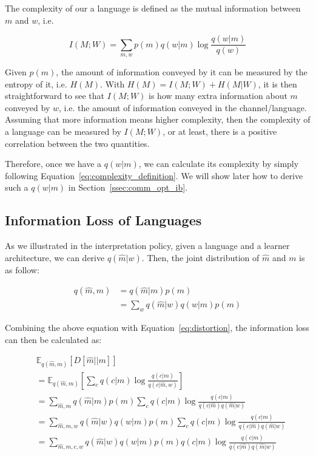 \documentclass[11pt]{article}
\begin{document}
The complexity of our a language is defined as the mutual information between $m$ and $w$, i.e. 

\begin{equation}
    I(M;W) = \sum_{m,w} p(m)q(w|m)\log \frac{q(w|m)}{q(w)}
    \label{eq:complexity_definition}
\end{equation}

Given $p(m)$, the amount of information conveyed by it can be measured by the entropy of it, i.e. $H(M)$.
With $H(M)=I(M;W)+H(M|W)$, it is then straightforward to see that $I(M;W)$ is how many extra information about $m$ conveyed by $w$, i.e. the amount of information conveyed in the channel/language.
Assuming that more information means higher complexity, then the complexity of a language can be measured by $I(M;W)$, or at least, there is a positive correlation between the two quantities.

Therefore, once we have a $q(w|m)$, we can calculate its complexity by simply following Equation~\ref{eq:complexity_definition}.
We will show later how to derive such a $q(w|m)$ in Section~\ref{ssec:comm_opt_ib}.

\subsection{Information Loss of Languages}
\label{ssec:lan_info_loss}

As we illustrated in the interpretation policy, given a language and a learner architecture, we can derive $q(\hat{m}|w)$.
Then, the joint distribution of $\hat{m}$ and $m$ is as follow:

\begin{equation}
    \begin{split}
        q(\hat{m},m) 
        & = q(\hat{m}|m)p(m) \\
        & = \sum_w q(\hat{m}|w)q(w|m)p(m)
    \end{split}
    \label{eq:joint_c_hat_c}
\end{equation}

Combining the above equation with Equation~\ref{eq:distortion}, the information loss can then be calculated as:

\begin{equation}
    \begin{split}
        & \mathbb{E}_{q(\hat{m},m)}\left[D[\hat{m}||m]\right] \\
        & = \mathbb{E}_{q(\hat{m},m)}\left[ \sum_{c} q(c|m) \log \frac{q(c|m)}{q(c|\hat{m}, w)} \right] \\
        & = \sum_{\hat{m},m} q(\hat{m}|m)p(m)\sum_{c} q(c|m)\log\frac{q(c|m)}{q(c|\hat{m})q(\hat{m}|w)} \\
        & = \sum_{\hat{m},m,w} q(\hat{m}|w)q(w|m)p(m)\sum_{c} q(c|m)\log\frac{q(c|m)}{q(c|\hat{m})q(\hat{m}|w)} \\
        & = \sum_{\hat{m},m,c,w}q(\hat{m}|w)q(w|m)p(m)q(c|m)\log\frac{q(c|m)}{q(c|\hat{m})q(\hat{m}|w)}
    \end{split}
    \label{eq:comm_info_loss}
\end{equation}
\end{document}
